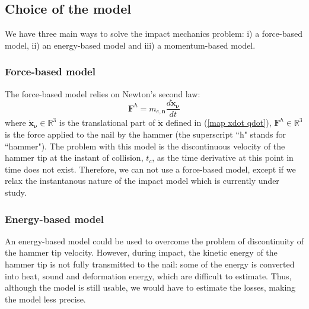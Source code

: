 \documentclass[conference]{IEEEtran}
\begin{document}
\subsection{Choice of the model}
\noindent
We have three main ways to solve the impact mechanics problem: i) a force-based model, ii) an energy-based model and iii) a momentum-based model.

\subsubsection{Force-based model}
\noindent
The force-based model relies on Newton's second law:
\begin{equation}
    \mathbf{F}^h= m_{e,\mathbf{n}} \frac{d \mathbf{\dot x_\nu}}{dt}
\end{equation}
where $\mathbf{\dot x_{\nu}} \in \mathbb{R}^3$ is the translational part of $\mathbf{\dot x}$ defined in (\ref{map xdot qdot}), $\mathbf{F}^h \in \mathbb{R}^3$ is the force applied to the nail by the hammer (the superscript ``h" stands for ``hammer").
The problem with this model is the discontinuous velocity of the hammer tip at the instant of collision, $t_c$, as the time derivative at this point in time does not exist. Therefore, we can not use a force-based model, except if we relax the instantanous nature of the impact model which is currently under study.
\\
\subsubsection{Energy-based model}
\label{Energy-based model}
\noindent
An energy-based model could be used to overcome the problem of discontinuity of the hammer tip velocity. 
However, during impact, the kinetic energy of the hammer tip is not fully transmitted to the nail: some of the energy is converted into heat, sound and deformation energy, which are difficult to estimate. 
Thus, although the model is still usable, we would have to estimate the losses, making the model less precise.
\\
\end{document}
